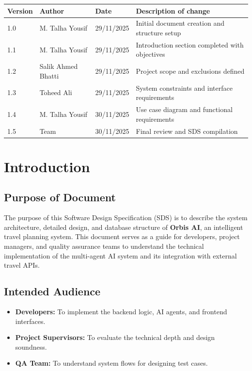 \documentclass[11pt, a4paper]{article}
\begin{document}
\begin{tabularx}{\textwidth}{|l|l|l|X|}
    \hline
    \textbf{Version} & \textbf{Author} & \textbf{Date} & \textbf{Description of change} \\
    \hline
    1.0 & M. Talha Yousif & 29/11/2025 & Initial document creation and structure setup \\
    \hline
    1.1 & M. Talha Yousif & 29/11/2025 & Introduction section completed with objectives \\
    \hline
    1.2 & Salik Ahmed Bhatti & 29/11/2025 & Project scope and exclusions defined \\
    \hline
    1.3 & Toheed Ali & 29/11/2025 & System constraints and interface requirements \\
    \hline
    1.4 & M. Talha Yousif & 30/11/2025 & Use case diagram and functional requirements \\
    \hline
    1.5 & Team & 30/11/2025 & Final review and SDS compilation \\
    \hline
\end{tabularx}

\newpage
\tableofcontents
\newpage

\section{Introduction}

\subsection{Purpose of Document}
The purpose of this Software Design Specification (SDS) is to describe the system architecture, detailed design, and database structure of \textbf{Orbis AI}, an intelligent travel planning system. This document serves as a guide for developers, project managers, and quality assurance teams to understand the technical implementation of the multi-agent AI system and its integration with external travel APIs.

\subsection{Intended Audience}
\begin{itemize}
    \item \textbf{Developers:} To implement the backend logic, AI agents, and frontend interfaces.
    \item \textbf{Project Supervisors:} To evaluate the technical depth and design soundness.
    \item \textbf{QA Team:} To understand system flows for designing test cases.
\end{itemize}
\end{document}
